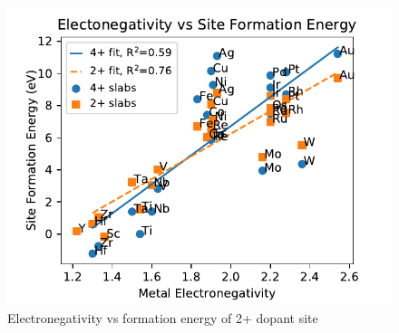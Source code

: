 \begin{figure}
\centering
\includegraphics[width=0.8\linewidth]{Images/electronegativity_vs_formation.pdf}
\caption{Electronegativity vs formation energy of 2+ dopant site}
\label{fig:electronegativity}
\end{figure}

